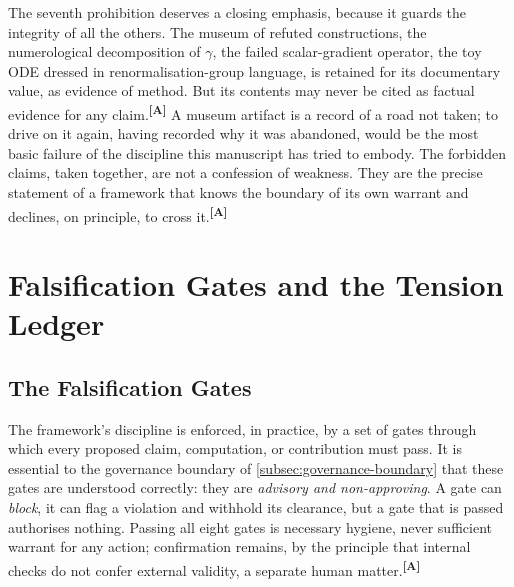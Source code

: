 \documentclass[12pt,a4paper,twoside]{article}
\theoremstyle{plain}
\theoremstyle{definition}
\theoremstyle{remark}
\newcommand{\catmark}[1]{\textsuperscript{\textsf{\textbf{[#1]}}}}
\begin{document}
\noindent The seventh prohibition deserves a closing emphasis, because it guards the integrity of all the others. The museum of refuted constructions, the numerological decomposition of $\gamma$, the failed scalar-gradient operator, the toy ODE dressed in renormalisation-group language, is retained for its documentary value, as evidence of method. But its contents may never be cited as factual evidence for any claim.\catmark{A} A museum artifact is a record of a road not taken; to drive on it again, having recorded why it was abandoned, would be the most basic failure of the discipline this manuscript has tried to embody. The forbidden claims, taken together, are not a confession of weakness. They are the precise statement of a framework that knows the boundary of its own warrant and declines, on principle, to cross it.\catmark{A}

\section{Falsification Gates and the Tension Ledger}
\label{sec:falsification-tension}

\subsection{The Falsification Gates}
\label{subsec:falsification-gates}

The framework's discipline is enforced, in practice, by a set of gates through which every proposed claim, computation, or contribution must pass. It is essential to the governance boundary of \cref{subsec:governance-boundary} that these gates are understood correctly: they are \emph{advisory and non-approving}. A gate can \emph{block}, it can flag a violation and withhold its clearance, but a gate that is passed authorises nothing. Passing all eight gates is necessary hygiene, never sufficient warrant for any action; confirmation remains, by the principle that internal checks do not confer external validity, a separate human matter.\catmark{A}
\end{document}
